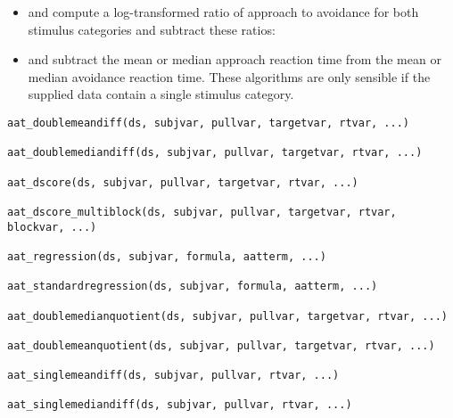 \documentclass[a4paper]{book}
\begin{document}
\begin{Description}
\begin{itemize}
\begin{itemize}
\end{itemize}

\item{}  and  compute a log-transformed ratio of approach to avoidance for both stimulus categories and subtract these ratios:

\item{}  and  subtract the mean or median approach reaction time from the mean or median avoidance reaction time.
These algorithms are only sensible if the supplied data contain a single stimulus category.

\end{itemize}

\end{Description}
%
\begin{Usage}
\begin{verbatim}
aat_doublemeandiff(ds, subjvar, pullvar, targetvar, rtvar, ...)

aat_doublemediandiff(ds, subjvar, pullvar, targetvar, rtvar, ...)

aat_dscore(ds, subjvar, pullvar, targetvar, rtvar, ...)

aat_dscore_multiblock(ds, subjvar, pullvar, targetvar, rtvar, blockvar, ...)

aat_regression(ds, subjvar, formula, aatterm, ...)

aat_standardregression(ds, subjvar, formula, aatterm, ...)

aat_doublemedianquotient(ds, subjvar, pullvar, targetvar, rtvar, ...)

aat_doublemeanquotient(ds, subjvar, pullvar, targetvar, rtvar, ...)

aat_singlemeandiff(ds, subjvar, pullvar, rtvar, ...)

aat_singlemediandiff(ds, subjvar, pullvar, rtvar, ...)
\end{verbatim}
\end{Usage}
%
\end{document}
